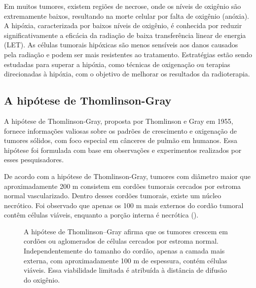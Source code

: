 \documentclass[11pt,a4paper]{article}
\begin{document}
	Em muitos tumores, existem regiões de necrose, onde os níveis de oxigênio são extremamente baixos, resultando na morte celular por falta de oxigênio (anóxia). A hipóxia, caracterizada por baixos níveis de oxigênio, é conhecida por reduzir significativamente a eficácia da radiação de baixa transferência linear de energia (LET). As células tumorais hipóxicas são menos sensíveis aos danos causados pela radiação e podem ser mais resistentes ao tratamento. Estratégias estão sendo estudadas para superar a hipóxia, como técnicas de oxigenação ou terapias direcionadas à hipóxia, com o objetivo de melhorar os resultados da radioterapia.

\subsection*{A hipótese de Thomlinson-Gray}

	A hipótese de Thomlinson-Gray, proposta por Thomlinson e Gray em 1955, fornece informações valiosas sobre os padrões de crescimento e oxigenação de tumores sólidos, com foco especial em cânceres de pulmão em humanos. Essa hipótese foi formulada com base em observações e experimentos realizados por esses pesquisadores.

	De acordo com a hipótese de Thomlinson-Gray, tumores com diâmetro maior que aproximadamente 200 \mu m consistem em cordões tumorais cercados por estroma normal vascularizado. Dentro desses cordões tumorais, existe um núcleo necrótico. Foi observado que apenas os 100 \mu m mais externos do cordão tumoral contêm células viáveis, enquanto a porção interna é necrótica ().

	\begin{figure}[h]
		\centering
		\caption{A hipótese de Thomlinson–Gray afirma que os tumores crescem em cordões ou aglomerados de células cercados por estroma normal. Independentemente do tamanho do cordão, apenas a camada mais externa, com aproximadamente 100 \mu m de espessura, contém células viáveis. Essa viabilidade limitada é atribuída à distância de difusão do oxigênio.}
		\label{fig:hipoteseThomlinsonGray}
	\end{figure}
\end{document}
